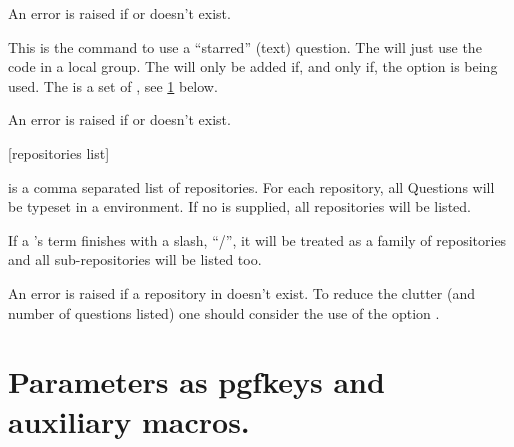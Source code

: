 \documentclass[10pt]{article}
\begin{document}
\begin{tsremark}
An error is raised if  or  doesn't exist.
\end{tsremark}

\begin{codedescribe}{\textQuestion}
\begin{codesyntax}%
\tsobj{\textQuestion}
\end{codesyntax}
This is the command to use a ``starred'' (text) question.
The \tsobj{\textQuestion} will just use the code in a local group. The  will only be added if, and only if, the  option is being used. The  is a set of , see \ref{parameters} below.
\end{codedescribe}

\begin{tsremark}
An error is raised if  or  doesn't exist.
\end{tsremark}

\begin{codedescribe}{\QuestionsList}\label{quest list}
\begin{codesyntax}%
\tsmacro{\QuestionsList}[repositories list]{}
\end{codesyntax}
 is a comma separated list of repositories. For each repository,  all Questions will be typeset in a  environment. If no  is supplied, all repositories will be listed.
\end{codedescribe}

\begin{tsremark}
If a 's term finishes with a slash, ``/'', it will be treated as a family of repositories and all sub-repositories will be listed too.
\end{tsremark}

\begin{tsremark}
An error is raised if a repository in  doesn't exist. To reduce the clutter (and number of questions listed) one should consider the use of the option .
\end{tsremark}

\section{Parameters as pgfkeys and auxiliary macros.}\label{parameters}
\end{document}
